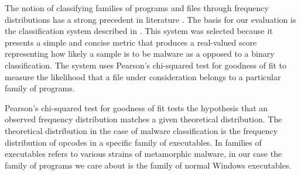    \begin{table}
        \centering
        \caption{The $32$ most frequent opcodes found in Windows executables.}
        \label{tab:results-opcode-dist}
    \end{table}

    The notion of classifying families of programs and files through frequency
    distributions has a strong precedent in literature
    \cite{chisquared,hmm_evade,stat_model,fileprints}. The basis for our
    evaluation is the classification system described in \cite{chisquared}.
    This system was selected because it presents a simple and concise metric
    that produces a real-valued score representing how likely a sample is to be
    malware as a opposed to a binary classification. The system uses Pearson's
    chi-squared test for goodness of fit to measure the likelihood that a file
    under consideration belongs to a particular family of programs.

    Pearson's chi-squared test for goodness of fit tests the hypothesis that
    an observed frequency distribution matches a given theoretical
    distribution. The theoretical distribution in the case of malware
    classification is the frequency distribution of opcodes in a specific
    family of executables. In \cite{chisquared} families of executables
    refers to various strains of metamorphic malware, in our case the family
    of programs we care about is the family of normal Windows executables.
    
